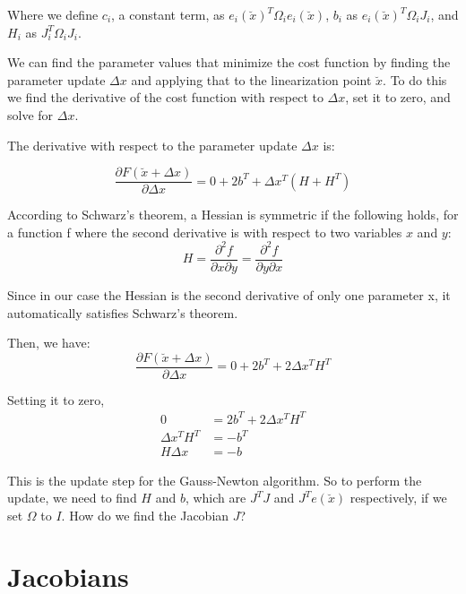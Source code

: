 \documentclass[twoside]{article}
\begin{document}
Where we define $c_i$, a constant term, as $e_i(\breve{x})^T \Omega_i e_i(\breve{x})$, $b_i$ as $e_i(\breve{x})^T \Omega_i J_i$, and $H_i$ as $J_i^T \Omega_i J_i$.

We can find the parameter values that minimize the cost function by finding the parameter update $\Delta x$ and applying that to the linearization point $\breve{x}$. To do this we find the derivative of the cost function with respect to $\Delta x$, set it to zero, and solve for $\Delta x$. 

The derivative with respect to the parameter update $\Delta x$ is:

\begin{equation}
\frac{\partial F(\breve{x} + \Delta x)}{\partial \Delta x} = 0 + 2b^T + \Delta x^T (H + H^T) 
\end{equation}

According to Schwarz's theorem, a Hessian is symmetric if the following holds, for a function f where the second derivative is with respect to two variables $x$ and $y$:
\begin{equation}
H = \frac{\partial^2 f}{\partial x \partial y} = \frac{\partial^2 f}{\partial y \partial x}
\end{equation}

Since in our case the Hessian is the second derivative of only one parameter x, it automatically satisfies Schwarz's theorem. 

Then, we have:
\begin{equation}
\frac{\partial F(\breve{x} + \Delta x)}{\partial \Delta x} = 0 + 2b^T + 2 \Delta x^T H^T
\end{equation}

Setting it to zero,
\begin{equation}
\begin{split}
0 &=  2b^T + 2 \Delta x^T H^T \\
\Delta x^T H^T &= -b^T \\
H \Delta x &= -b
\end{split}
\end{equation}

This is the update step for the Gauss-Newton algorithm. So to perform the update, we need to find $H$ and $b$, which are $J^TJ$ and $J^Te(\breve{x})$ respectively, if we set $\Omega$ to $I$. How do we find the Jacobian $J$?

\section{Jacobians}
\end{document}
